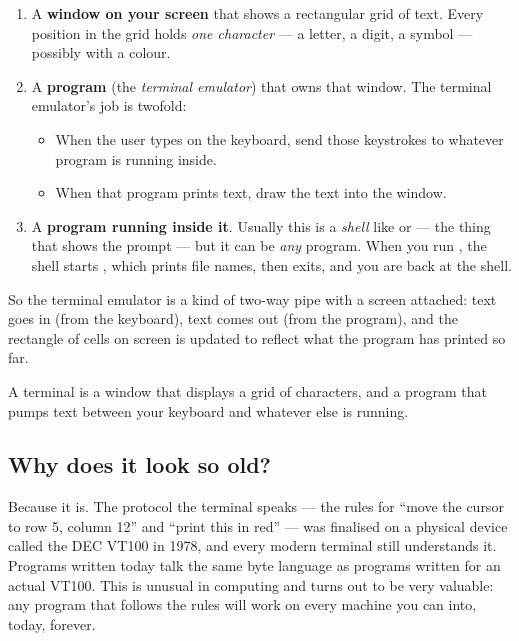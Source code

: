 \begin{enumerate}[leftmargin=*]
  \item A \textbf{window on your screen} that shows a rectangular grid
    of text. Every position in the grid holds \emph{one character} ---
    a letter, a digit, a symbol --- possibly with a colour.
  \item A \textbf{program} (the \emph{terminal emulator}) that owns
    that window. The terminal emulator's job is twofold:
    \begin{itemize}[leftmargin=*]
      \item When the user types on the keyboard, send those keystrokes
        to whatever program is running inside.
      \item When that program prints text, draw the text into the
        window.
    \end{itemize}
  \item A \textbf{program running inside it}. Usually this is a
    \emph{shell} like  or  --- the thing that
    shows the \code{\$} prompt --- but it can be \emph{any} program.
    When you run , the shell starts , which prints
    file names, then exits, and you are back at the shell.
\end{enumerate}

So the terminal emulator is a kind of two-way pipe with a screen
attached: text goes in (from the keyboard), text comes out (from the
program), and the rectangle of cells on screen is updated to reflect
what the program has printed so far.

\begin{idea}
A terminal is a window that displays a grid of characters, and a
program that pumps text between your keyboard and whatever else is
running.
\end{idea}

\subsection{Why does it look so old?}

Because it is. The protocol the terminal speaks --- the rules for
``move the cursor to row 5, column 12'' and ``print this in red'' ---
was finalised on a physical device called the DEC VT100 in 1978, and
every modern terminal still understands it. Programs written today
talk the same byte language as programs written for an actual VT100.
This is unusual in computing and turns out to be very valuable: any
program that follows the rules will work on every machine you can
 into, today, forever.

